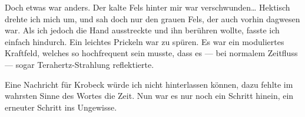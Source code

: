 Doch etwas war anders. Der kalte Fels hinter mir war verschwunden\dots{}
Hektisch drehte ich mich um, und sah doch nur den grauen Fels, der auch vorhin dagwesen war. Als ich jedoch die Hand ausstreckte und ihn berühren wollte, fasste ich einfach hindurch. Ein leichtes Prickeln war zu spüren. Es war ein moduliertes Kraftfeld, welches so hochfrequent sein musste, dass es --- bei normalem Zeitfluss --- sogar Terahertz-Strahlung reflektierte.

Eine Nachricht für Krobeck würde ich nicht hinterlassen können, dazu fehlte im wahrsten Sinne des Wortes die Zeit. 
Nun war es nur noch ein Schritt hinein, ein erneuter Schritt ins Ungewisse. 
